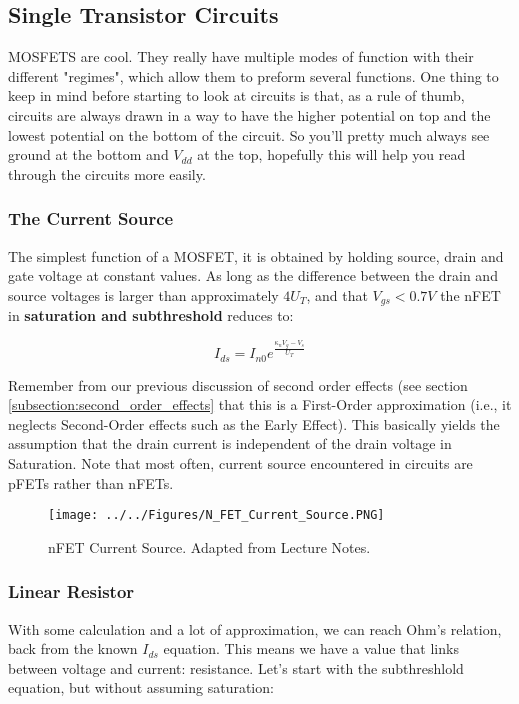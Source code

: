\subsection{Single Transistor Circuits}
MOSFETS are cool. They really have multiple modes of function with their different "regimes", which allow them to preform several functions. One thing to keep in mind before starting to look at circuits is that, as a rule of thumb, circuits are always drawn in a way to have the higher potential on top and the lowest potential on the bottom of the circuit. So you'll pretty much always see ground at the bottom and $V_{dd}$ at the top, hopefully this will help you read through the circuits more easily. 


\subsubsection{The Current Source}
The simplest function of a MOSFET, it is obtained by holding source, drain and gate voltage at constant values. As long as the difference between the drain and source voltages is larger than approximately $4U_T$, and that $V_{gs} < 0.7V$ the nFET in \textbf{saturation and subthreshold} reduces to:

\begin{equation}
    I_{ds} =  I_{n0} e^{\frac{\kappa_{n}V_g - V_s}{U_T}} 
\end{equation}

Remember from our previous discussion of second order effects (see section \ref{subsection:second_order_effects} that this is a First-Order approximation (i.e., it neglects Second-Order effects such as the Early Effect). This basically yields the assumption that the drain current is independent of the drain voltage in Saturation. Note that most often, current source encountered in circuits are pFETs rather than nFETs.

\begin{figure}[H]
    \centering
    \texttt{[image: ../../Figures/N\_FET\_Current\_Source.PNG]}
    \caption{nFET Current Source. Adapted from Lecture Notes.}
    \label{fig:basalandcerebellum}
\end{figure}

\subsubsection{Linear Resistor}

With some calculation and a lot of approximation, we can reach Ohm's relation, back from the known $I_{ds}$ equation. This means we have a value that links between voltage and current: resistance. Let's start with the subthreshlold equation, but without assuming saturation: 

